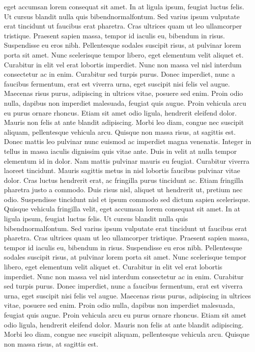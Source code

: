 \documentclass[letterpaper, twoside, 12pt, memoire, creativecommons, hyperref]{thETS}
\begin{document}
\begin{introduction}
eget accumsan lorem consequat sit amet. In at ligula ipsum, feugiat luctus felis. Ut cursus blandit nulla quis bibendnormalfontum. Sed varius ipsum vulputate erat tincidunt ut faucibus erat pharetra. Cras ultrices quam ut leo ullamcorper tristique. Praesent sapien massa, tempor id iaculis eu, bibendum in risus. Suspendisse eu eros nibh. Pellentesque sodales suscipit risus, at pulvinar lorem porta sit amet. Nunc scelerisque tempor libero, eget elementum velit aliquet et. Curabitur in elit vel erat lobortis imperdiet. Nunc non massa vel nisl interdum consectetur ac in enim. Curabitur sed turpis purus. Donec imperdiet, nunc a faucibus fermentum, erat est viverra urna, eget suscipit nisi felis vel augue. Maecenas risus purus, adipiscing in ultrices vitae, posuere sed enim. Proin odio nulla, dapibus non imperdiet malesuada, feugiat quis augue. Proin vehicula arcu eu purus ornare rhoncus. Etiam sit amet odio ligula, hendrerit eleifend dolor. Mauris non felis at ante blandit adipiscing. Morbi leo diam, congue nec suscipit aliquam, pellentesque vehicula arcu. Quisque non massa risus, at sagittis est. Donec mattis leo pulvinar nunc euismod ac imperdiet magna venenatis. Integer in tellus in massa iaculis dignissim quis vitae ante. Duis in velit at nulla tempor elementum id in dolor. Nam mattis pulvinar mauris eu feugiat. Curabitur viverra laoreet tincidunt. Mauris sagittis metus in nisl lobortis faucibus pulvinar vitae dolor. Cras luctus hendrerit erat, ac fringilla purus tincidunt ac. Etiam fringilla pharetra justo a commodo. Duis risus nisl, aliquet ut hendrerit ut, pretium nec odio. Suspendisse tincidunt nisl et ipsum commodo sed dictum sapien scelerisque. Quisque vehicula fringilla velit, eget accumsan lorem consequat sit amet. In at ligula ipsum, feugiat luctus felis. Ut cursus blandit nulla quis bibendnormalfontum. Sed varius ipsum vulputate erat tincidunt ut faucibus erat pharetra. Cras ultrices quam ut leo ullamcorper tristique. Praesent sapien massa, tempor id iaculis eu, bibendum in risus. Suspendisse eu eros nibh. Pellentesque sodales suscipit risus, at pulvinar lorem porta sit amet. Nunc scelerisque tempor libero, eget elementum velit aliquet et. Curabitur in elit vel erat lobortis imperdiet. Nunc non massa vel nisl interdum consectetur ac in enim. Curabitur sed turpis purus. Donec imperdiet, nunc a faucibus fermentum, erat est viverra urna, eget suscipit nisi felis vel augue. Maecenas risus purus, adipiscing in ultrices vitae, posuere sed enim. Proin odio nulla, dapibus non imperdiet malesuada, feugiat quis augue. Proin vehicula arcu eu purus ornare rhoncus. Etiam sit amet odio ligula, hendrerit eleifend dolor. Mauris non felis at ante blandit adipiscing. Morbi leo diam, congue nec suscipit aliquam, pellentesque vehicula arcu. Quisque non massa risus, at sagittis est.


\end{introduction}
\end{document}
